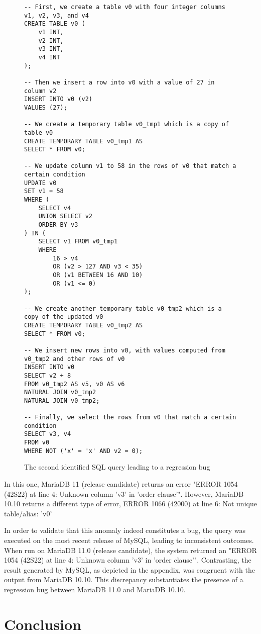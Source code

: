 \documentclass[sigconf]{acmart}
\begin{document}
\begin{figure}
\centering
\begin{lstlisting}
-- First, we create a table v0 with four integer columns v1, v2, v3, and v4
CREATE TABLE v0 (
    v1 INT,
    v2 INT,
    v3 INT,
    v4 INT
);

-- Then we insert a row into v0 with a value of 27 in column v2
INSERT INTO v0 (v2) 
VALUES (27);

-- We create a temporary table v0_tmp1 which is a copy of table v0
CREATE TEMPORARY TABLE v0_tmp1 AS 
SELECT * FROM v0;

-- We update column v1 to 58 in the rows of v0 that match a certain condition
UPDATE v0 
SET v1 = 58 
WHERE (
    SELECT v4 
    UNION SELECT v2 
    ORDER BY v3
) IN (
    SELECT v1 FROM v0_tmp1 
    WHERE 
        16 > v4 
        OR (v2 > 127 AND v3 < 35) 
        OR (v1 BETWEEN 16 AND 10) 
        OR (v1 <= 0)
);

-- We create another temporary table v0_tmp2 which is a copy of the updated v0
CREATE TEMPORARY TABLE v0_tmp2 AS 
SELECT * FROM v0;

-- We insert new rows into v0, with values computed from v0_tmp2 and other rows of v0
INSERT INTO v0 
SELECT v2 + 8 
FROM v0_tmp2 AS v5, v0 AS v6 
NATURAL JOIN v0_tmp2 
NATURAL JOIN v0_tmp2;

-- Finally, we select the rows from v0 that match a certain condition
SELECT v3, v4 
FROM v0 
WHERE NOT ('x' = 'x' AND v2 = 0);
\end{lstlisting}
\caption{The second identified SQL query leading to a regression bug}
\label{fig:bug_2}
\end{figure}

In this one, MariaDB 11 (release candidate) returns an error "ERROR 1054 (42S22) at line 4: Unknown column 'v3' in 'order clause'". However, MariaDB 10.10 returns a different type of error, ERROR 1066 (42000) at line 6: Not unique table/alias: 'v0'

In order to validate that this anomaly indeed constitutes a bug, the query was executed on the most recent release of MySQL, leading to inconsistent outcomes. When run on MariaDB 11.0 (release candidate), the system returned an "ERROR 1054 (42S22) at line 4: Unknown column 'v3' in 'order clause'". Contrasting, the result generated by MySQL, as depicted in the appendix, was congruent with the output from MariaDB 10.10. This discrepancy substantiates the presence of a regression bug between MariaDB 11.0 and MariaDB 10.10.
\section{Conclusion}
\end{document}
